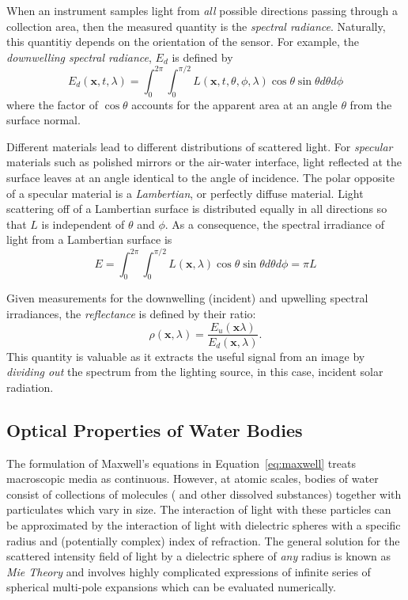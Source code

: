 When an instrument samples light from \textit{all} possible directions passing
through a collection area, then the
measured quantity is the \textit{spectral radiance}. Naturally, this quantitiy
depends on the orientation of the sensor. For example, the \textit{downwelling
  spectral radiance}, $E_d$ is defined by
\begin{equation}
  E_d(\mathbf{x}, t, \lambda) = \int_0^{2\pi} \int_0^{\pi/2}L(\mathbf{x}, t, \theta, \phi, \lambda)\cos\theta \sin\theta d\theta d\phi
\end{equation}
where the factor of $\cos\theta$ accounts for the apparent area at an angle
$\theta$ from the surface normal.

Different materials lead to different distributions of scattered light. For
\textit{specular} materials such as polished mirrors or the air-water interface, light
reflected at the surface leaves at an angle identical to the angle of incidence.
The polar opposite of a specular material is a \textit{Lambertian}, or perfectly
diffuse material. Light scattering off of a Lambertian surface is distributed
equally in all directions so that $L$ is independent of $\theta$ and $\phi$. As
a consequence, the spectral irradiance of light from a Lambertian surface is
\begin{equation}
  E = \int_0^{2\pi}\int_0^{\pi/2} L(\mathbf{x}, \lambda)\cos\theta \sin\theta d\theta d\phi = \pi L
\end{equation}

Given measurements for the downwelling (incident) and upwelling spectral
irradiances, the \textit{reflectance} is defined by their ratio:
\begin{equation}
  \rho(\mathbf{x},\lambda) = \dfrac{E_u(\mathbf{x}\lambda)}{E_d(\mathbf{x}, \lambda)}.
\end{equation}
This quantity is valuable as it extracts the useful signal from an image by
\textit{dividing out} the spectrum from the lighting source, in this case,
incident solar radiation.

\subsection{Optical Properties of Water Bodies}\label{sec:optical-properties-water}

The formulation of Maxwell's equations in Equation~\ref{eq:maxwell} treats
macroscopic media as continuous. However, at atomic scales, bodies of water
consist of collections of molecules ( and other dissolved substances)
together with particulates which vary in size. The interaction of light with
these particles can be approximated by the interaction of light with dielectric
spheres with a specific radius and (potentially complex) index of refraction.
The general solution for the scattered intensity field of light by a dielectric
sphere of \textit{any} radius is known as \textit{Mie Theory} and involves
highly complicated expressions of infinite series of spherical multi-pole
expansions which can be evaluated numerically.

